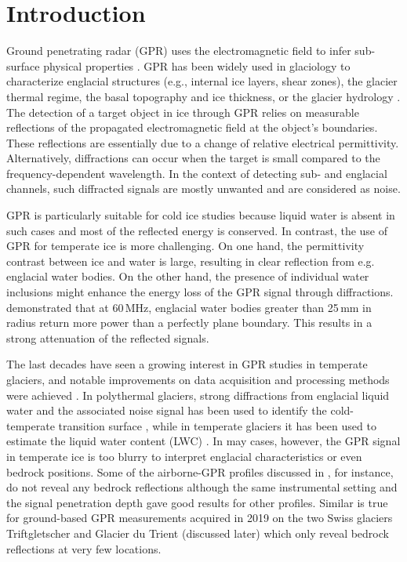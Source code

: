 \section{Introduction} 

Ground penetrating radar (GPR) uses the electromagnetic field to infer sub-surface physical properties \citep{Davis&Annan1989}. GPR has been widely used in glaciology to characterize englacial structures (e.g., internal ice layers, shear zones), the glacier thermal regime, the basal topography and ice thickness, or the glacier hydrology \citep[see][for reviews]{Woodward&Burke2007,Plewes&Hubbard2001,Navarro&Eisen2009,Schroeder&al2020}. The detection of a target object in ice through GPR relies on measurable reflections of the propagated electromagnetic field at the object's boundaries. These reflections are essentially due to a change of relative electrical permittivity. Alternatively, diffractions can occur when the target is small compared to the frequency-dependent wavelength. In the context of detecting sub- and englacial channels, such diffracted signals are mostly unwanted and are considered as noise. 

GPR is particularly suitable for cold ice studies because liquid water is absent in such cases and most of the reflected energy is conserved. In contrast, the use of GPR for temperate ice is more challenging. On one hand, the permittivity contrast between ice and water is large, resulting in clear reflection from e.g. englacial water bodies. On the other hand, the presence of individual water inclusions might enhance the energy loss of the GPR signal through diffractions. \cite{Bamber1988} demonstrated that at 60\,MHz, englacial water bodies greater than 25\,mm in radius return more power than a perfectly plane boundary. This results in a strong attenuation of the reflected signals. 

The last decades have seen a growing interest in GPR studies in temperate glaciers, and notable improvements on data acquisition and processing methods were achieved \citep[e.g.][]{Schroeder&al2020}. In polythermal glaciers, strong diffractions from englacial liquid water and the associated noise signal has been used to identify the cold-temperate transition surface \citep[e.g.][]{Bjornsson&el1996}, while in temperate glaciers it has been used to estimate the liquid water content (LWC) \citep[e.g.][]{Murray&al2000}. In may cases, however, the GPR signal in temperate ice is too blurry to interpret englacial characteristics or even bedrock positions. Some of the airborne-GPR profiles discussed in \cite{Grab&al2021}, for instance, do not reveal any bedrock reflections although the same instrumental setting and the signal penetration depth gave good results for other profiles. Similar is true for ground-based GPR measurements acquired in 2019 on the two Swiss glaciers Triftgletscher and Glacier du Trient (discussed later) which only reveal bedrock reflections at very few locations. 

